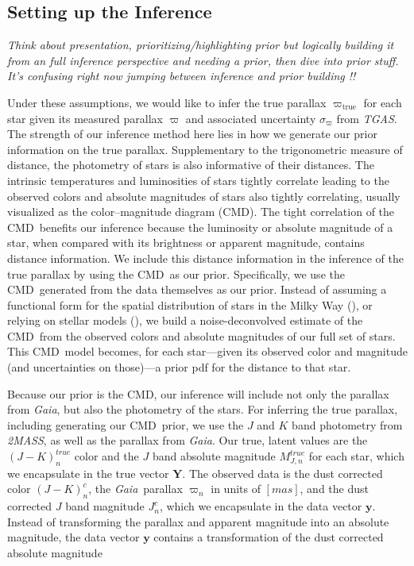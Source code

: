 \documentclass[modern]{aastex61}
\newcommand{\acronym}[1]{{\small{#1}}}
\newcommand{\project}[1]{\textsl{#1}}
\newcommand{\tgas}{\project{\acronym{TGAS}}}
\newcommand{\tmass}{\project{\acronym{2MASS}}}
\newcommand{\gaia}{\project{Gaia}}
\newcommand{\cmd}{\acronym{CMD}}
\newcommand{\true}{\mathrm{true}}
\begin{document}
\subsection{Setting up the Inference}
 \emph{Think about presentation, prioritizing/highlighting prior but logically building it from an full inference perspective and needing a prior, then dive into prior stuff. It's confusing right now jumping between inference and prior building !!}

Under these assumptions, we would like to infer the true parallax $\varpi_{\true}$ for each star given its measured parallax $\varpi$ and associated uncertainty $\sigma_{\varpi}$ from \tgas.
The strength of our inference method here lies in how we generate our prior information on the true parallax.
Supplementary to the trigonometric measure of distance, the photometry of stars is also informative of their distances.
The intrinsic temperatures and luminosities of stars tightly correlate leading to the observed colors and absolute magnitudes of stars also tightly correlating, usually visualized as the color--magnitude diagram (\cmd).
The tight correlation of the \cmd\ benefits our inference because the luminosity or absolute magnitude of a star, when compared with its brightness or apparent magnitude, contains distance information.
We include this distance information in the inference of the true parallax by using the \cmd\ as our prior.
Specifically, we use the \cmd\ generated from the data themselves as our prior.
Instead of assuming a functional form for the spatial distribution of stars in the Milky Way (\citealt{astraatmadja16b}), or relying on stellar models (\citealt{gaia16}), we build a noise-deconvolved estimate of the \cmd\ from the observed colors and absolute magnitudes of our full set of stars.
This \cmd\ model becomes, for each star---given its observed color and magnitude (and uncertainties on those)---a prior pdf for the distance to that star.

Because our prior is the \cmd, our inference will include not only the parallax from \gaia, but also the photometry of the stars. For inferring the true parallax, including generating our \cmd\ prior, we use the $J$ and $K$ band photometry from \tmass, as well as the parallax from \gaia. Our true, latent values are the $(J-K)^{true}_n$ color and the $J$ band absolute magnitude $M^{true}_{J,n}$ for each star, which we encapsulate in the true vector $\mathbf{Y}$. The observed data is the dust corrected color $(J-K)^c_n$, the \gaia\ parallax $\varpi_n$ in units of $[mas]$, and the dust corrected $J$ band magnitude $J^c_n$, which we encapsulate in the data vector $\mathbf{y}$. Instead of transforming the parallax and apparent magnitude into an absolute magnitude, the data vector $\mathbf{y}$ contains a transformation of the dust corrected absolute magnitude
\end{document}
